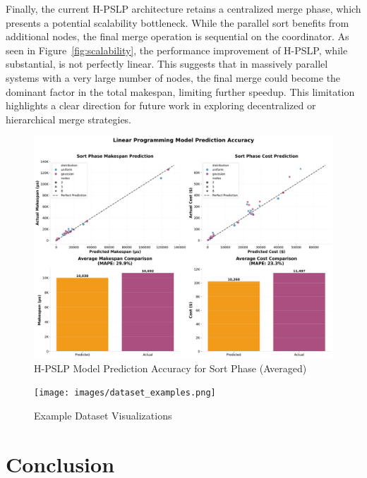 \documentclass{article}
\begin{document}
Finally, the current H-PSLP architecture retains a centralized merge phase, which presents a potential scalability bottleneck. While the parallel sort benefits from additional nodes, the final merge operation is sequential on the coordinator. As seen in Figure~\ref{fig:scalability}, the performance improvement of H-PSLP, while substantial, is not perfectly linear. This suggests that in massively parallel systems with a very large number of nodes, the final merge could become the dominant factor in the total makespan, limiting further speedup. This limitation highlights a clear direction for future work in exploring decentralized or hierarchical merge strategies.

\begin{figure}[h!]
    \centering
    \includegraphics[width=1\linewidth]{images/lp_prediction_accuracy.png}
    \caption{H-PSLP Model Prediction Accuracy for Sort Phase (Averaged)}
    \label{fig:lp_accuracy}
\end{figure}


\begin{figure}[h!]
    \centering
    \texttt{[image: images/dataset\_examples.png]}
    \caption{Example Dataset Visualizations}
    \label{fig:dataset_examples}
\end{figure}



\section{Conclusion}
\end{document}
